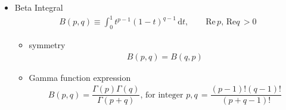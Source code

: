 \begin{itemize}[topsep=2pt,itemsep=0pt]
    
    \item Beta Integral 
    \begin{align*}
        B(p,q)\equiv \int_0^1 t^{p-1}(1-t)^{q-1}\,\mathrm{d}t,\qquad  \mathrm{Re}\,p,\,\mathrm{Re}q \,>0
    \end{align*}
    \begin{itemize}[topsep=2pt,itemsep=0pt]
        \item symmetry
        \begin{align*}
            B(p,q)=B(q,p) 
        \end{align*}
        \item Gamma function expression
        \begin{align*}
            B(p,q)=\dfrac{\Gamma (p)\Gamma (q)}{\Gamma (p+q)},\,\text{for integer }p,q \,=\dfrac{(p-1)!(q-1)!}{(p+q-1)!}
        \end{align*}
        
    \end{itemize} 
    
    


 

\end{itemize}

    

